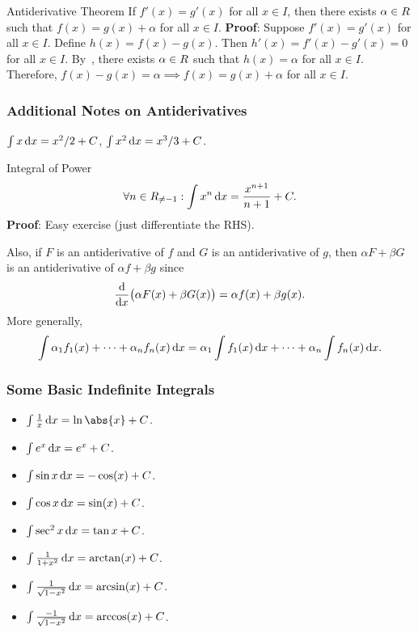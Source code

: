 \begin{Theorem}{Antiderivative Theorem}{}
    If $ f'(x)=g'(x) $ for all $ x\in I $, then there exists $ \alpha\in\relax{R} $
    such that $ f(x)=g(x)+\alpha $ for all $ x\in I $.
    \tcblower{}
    \textbf{Proof}: Suppose $ f'(x)=g'(x) $ for all $ x\in I $. Define $ h(x)=f(x)-g(x) $.
    Then $ h'(x)=f'(x)-g'(x)=0 $
    for all $ x\in I $.
    By~,
    there exists $ \alpha\in\relax{R} $ such that $ h(x)=\alpha $ for all $ x\in I $.
    Therefore, $ f(x)-g(x)=\alpha\implies f(x)=g(x)+\alpha $ for all $ x\in I $.
\end{Theorem}
\subsubsection*{Additional Notes on Antiderivatives}
\begin{Example}{}{}
    $ \int x\odif{x}=x^2/2+C $, $ \int x^2\odif{x}=x^3/3+C $.
\end{Example}
\begin{Theorem}{Integral of Power}{}
    \[ \forall n\in\R_{\ne -1}: \int x^n\odif{x}=\frac{x^{n+1}}{n+1}+C. \]
    \tcblower{}
    \textbf{Proof}: Easy exercise (just differentiate the RHS).
\end{Theorem}
Also, if $ F $ is an antiderivative of $ f $ and $ G $
is an antiderivative of $ g $, then $ \alpha F+\beta G $
is an antiderivative of $ \alpha f+\beta g $
since
\[ \odv*{\bigl(\alpha F(x)+\beta G(x)\bigr)}{x}=\alpha f(x)+\beta g(x). \]
More generally,
\[ \int \alpha_1f_1(x)+\cdots+\alpha_n f_n(x)\odif{x}=\alpha_1 \int f_1(x)\odif{x}+\cdots+\alpha_n \int f_n(x)\odif{x}. \]
\subsubsection*{Some Basic Indefinite Integrals}
\begin{itemize}
    \item $ \int \frac{1}{x}\odif{x}=\ln\abs{x}+C $.
    \item $ \int e^x\odif{x}=e^x+C $.
    \item $ \int \sin x\odif{x}=-\cos (x)+C $.
    \item $ \int \cos x\odif{x}=\sin(x)+C $.
    \item $ \int \sec^2 x\odif{x}=\tan x+C $.
    \item $ \int \frac{1}{1+x^2}\odif{x}=\arctan(x)+C $.
    \item $ \int \frac{1}{\sqrt{1-x^2}}\odif{x}=\arcsin(x)+C $.
    \item $ \int \frac{-1}{\sqrt{1-x^2}}\odif{x}=\arccos(x)+C $.
\end{itemize}